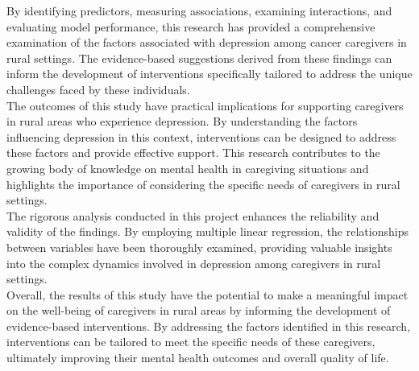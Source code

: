 \documentclass[11pt]{article}\usepackage[]{graphicx}\usepackage[]{xcolor}
\numberwithin{equation}{section}
\numberwithin{table}{section}
\begin{document}
\noindent By identifying predictors, measuring associations, examining interactions, and evaluating model performance, this research has provided a comprehensive examination of the factors associated with depression among cancer caregivers in rural settings. The evidence-based suggestions derived from these findings can inform the development of interventions specifically tailored to address the unique challenges faced by these individuals.\\

\noindent The outcomes of this study have practical implications for supporting caregivers in rural areas who experience depression. By understanding the factors influencing depression in this context, interventions can be designed to address these factors and provide effective support. This research contributes to the growing body of knowledge on mental health in caregiving situations and highlights the importance of considering the specific needs of caregivers in rural settings.\\

\noindent The rigorous analysis conducted in this project enhances the reliability and validity of the findings. By employing multiple linear regression, the relationships between variables have been thoroughly examined, providing valuable insights into the complex dynamics involved in depression among caregivers in rural settings.\\

\noindent Overall, the results of this study have the potential to make a meaningful impact on the well-being of caregivers in rural areas by informing the development of evidence-based interventions. By addressing the factors identified in this research, interventions can be tailored to meet the specific needs of these caregivers, ultimately improving their mental health outcomes and overall quality of life.
\newpage
\end{document}
